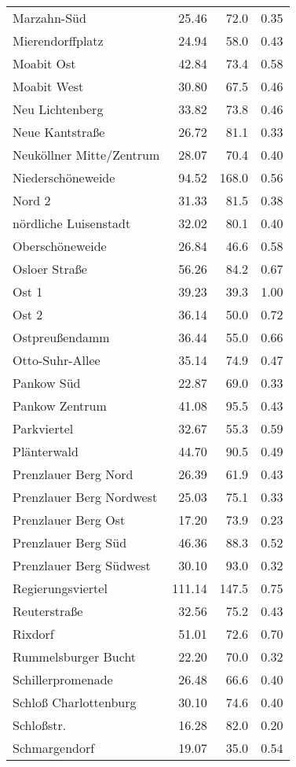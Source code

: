 \begin{tabular}{lrrr}
Marzahn-Süd & 25.46 & 72.0 & 0.35\\
Mierendorffplatz & 24.94 & 58.0 & 0.43\\
Moabit Ost & 42.84 & 73.4 & 0.58\\
Moabit West & 30.80 & 67.5 & 0.46\\
Neu Lichtenberg & 33.82 & 73.8 & 0.46\\
Neue Kantstraße & 26.72 & 81.1 & 0.33\\
Neuköllner Mitte/Zentrum & 28.07 & 70.4 & 0.40\\
Niederschöneweide & 94.52 & 168.0 & 0.56\\
Nord 2 & 31.33 & 81.5 & 0.38\\
nördliche Luisenstadt & 32.02 & 80.1 & 0.40\\
Oberschöneweide & 26.84 & 46.6 & 0.58\\
Osloer Straße & 56.26 & 84.2 & 0.67\\
Ost 1 & 39.23 & 39.3 & 1.00\\
Ost 2 & 36.14 & 50.0 & 0.72\\
Ostpreußendamm & 36.44 & 55.0 & 0.66\\
Otto-Suhr-Allee & 35.14 & 74.9 & 0.47\\
Pankow Süd & 22.87 & 69.0 & 0.33\\
Pankow Zentrum & 41.08 & 95.5 & 0.43\\
Parkviertel & 32.67 & 55.3 & 0.59\\
Plänterwald & 44.70 & 90.5 & 0.49\\
Prenzlauer Berg Nord & 26.39 & 61.9 & 0.43\\
Prenzlauer Berg Nordwest & 25.03 & 75.1 & 0.33\\
Prenzlauer Berg Ost & 17.20 & 73.9 & 0.23\\
Prenzlauer Berg Süd & 46.36 & 88.3 & 0.52\\
Prenzlauer Berg Südwest & 30.10 & 93.0 & 0.32\\
Regierungsviertel & 111.14 & 147.5 & 0.75\\
Reuterstraße & 32.56 & 75.2 & 0.43\\
Rixdorf & 51.01 & 72.6 & 0.70\\
Rummelsburger Bucht & 22.20 & 70.0 & 0.32\\
Schillerpromenade & 26.48 & 66.6 & 0.40\\
Schloß Charlottenburg & 30.10 & 74.6 & 0.40\\
Schloßstr. & 16.28 & 82.0 & 0.20\\
Schmargendorf & 19.07 & 35.0 & 0.54\\

\end{tabular}
